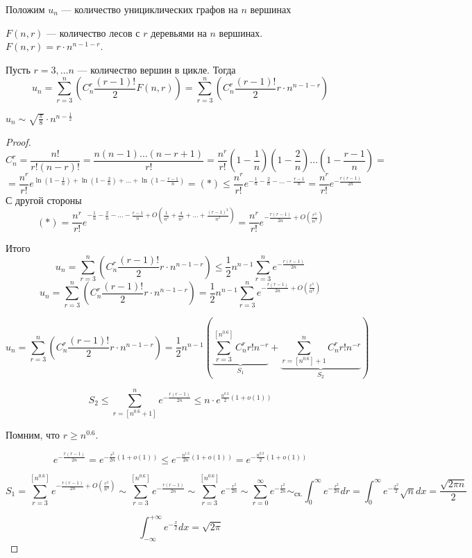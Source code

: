 Положим \(u_n\) --- количество унициклических графов на \(n\) вершинах

\begin{lemma}
    \(F(n, r)\) --- количество лесов с \(r\) деревьями на \(n\) вершинах. \(F(n, r) = r\cdot n^{n - 1 - r}\).
\end{lemma}

Пусть \(r = 3, \dots n\) --- количество вершин в цикле. Тогда
\[u_n = \sum_{r = 3}^n \left(C_n^r \frac{(r - 1)!}{2}F(n, r)\right) = \sum_{r = 3}^n \left(C_n^r \frac{(r - 1)!}{2}r \cdot n^{n - 1 - r}\right)\]

\begin{proposition}
    \(u_n \sim \sqrt{\frac{\pi}{8}}\cdot n^{n - \frac{1}{2}}\)
\end{proposition}

\begin{proof}
    \[C_n^r = \frac{n!}{r!(n - r)!} = \frac{n(n - 1)\dots(n - r + 1)}{r!} = \frac{n^r}{r!}\left(1 - \frac{1}{n}\right)\left(1 - \frac{2}{n}\right)\dots \left(1 - \frac{r-1}{n}\right) = \]
    \[= \frac{n^r}{r!}e^{\ln\left(1 - \frac{1}{n}\right) + \ln\left(1 - \frac{2}{n}\right) + \dots + \ln\left(1 - \frac{r-1}{n}\right)}  = (*) \le \frac{n^r}{r!}e^{-\frac{1}{n}-\frac{2}{n} - \dots - \frac{r - 1}{n}} = \frac{n^r}{r!}e^{-\frac{r(r-1)}{2n}}\]
    С другой стороны
    \[(*) = \frac{n^r}{r!}e^{-\frac{1}{n}-\frac{2}{n} - \dots - \frac{r - 1}{n} + O\left(\frac{1}{n^2} + \frac{4}{n^2} + \dots + \frac{(r - 1)^2}{n^2}\right)} = \frac{n^r}{r!}e^{-\frac{r(r-1)}{2n} + O\left(\frac{r^3}{n^3}\right)}\]

    Итого
    \[u_n = \sum_{r = 3}^n \left(C_n^r \frac{(r - 1)!}{2}r \cdot n^{n - 1 - r}\right) \le \frac{1}{2}n^{n - 1}\sum_{r = 3}^n e^{-\frac{r(r-1)}{2n}}\]
    \[u_n = \sum_{r = 3}^n \left(C_n^r \frac{(r - 1)!}{2}r \cdot n^{n - 1 - r}\right) = \frac{1}{2}n^{n - 1}\sum_{r = 3}^n e^{-\frac{r(r-1)}{2n} + O\left(\frac{r^3}{n^3}\right)}\]
    
    
    \[u_n = \sum_{r = 3}^n \left(C_n^r \frac{(r - 1)!}{2}r \cdot n^{n - 1 - r}\right) = \frac{1}{2}n^{n - 1}\left(\underbrace{\sum_{r = 3}^{[n^{0.6}]} C_n^r r! n^{-r}}_{S_1} + \underbrace{\sum_{r = [n^{0.6}] + 1}^{n} C_n^r r! n^{-r}}_{S_2}\right)\]

    \[S_2 \le \sum_{r = [n^{0.6} + 1]}^ne^{-\frac{r(r-1)}{2n}} \le n \cdot e^{\frac{n^{0.2}}{2}(1 + o(1))}\]
    
    Помним, что \(r \ge n^{0.6}\).

    \[e^{-\frac{r(r-1)}{2n}} = e^{-\frac{r^2}{2n}(1 + o(1))} \le e^{-\frac{n^{1.2}}{2n}(1 + o(1))} = e^{-\frac{n^{0.2}}{2}(1 + o(1))}\]

    \[S_1 = \sum_{r = 3}^{[n^0.6]}e^{-\frac{r(r-1)}{2n} + O\left(\frac{r^3}{n^3}\right)} \sim \sum_{r = 3}^{[n^0.6]}e^{-\frac{r(r-1)}{2n}} \sim \sum_{r = 3}^{[n^0.6]}e^{-\frac{r^2}{2n}} \sim \sum_{r = 0}^{\infty}e^{-\frac{r^2}{2n}} \sim_{\text{сх.}} \int_0^\infty e^{-\frac{r^2}{2n}}dr = \int_0^\infty e^{-\frac{x^2}{2}}\sqrt{n}dx = \frac{\sqrt{2\pi n}}{2}\]
    
    \[\int_{-\infty}^{+\infty} e^{-\frac{x}{2}}dx = \sqrt{2\pi}\]
\end{proof}